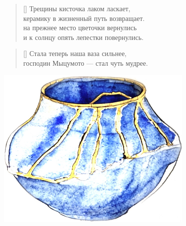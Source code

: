 \documentclass[a5paper,11pt]{memoir}
\begin{document}
\newpage

\begin{verse}[\versewidth]
Трещины кисточка лаком ласкает, \\
керамику в жизненный путь возвращает. \\
на прежнее место цветочки вернулись\\ 
и к солнцу опять лепестки повернулись.
\end{verse}

\begin{verse}[\versewidth]
Стала теперь наша ваза сильнее, \\
господин Мыцумото --- стал чуть мудрее.
\end{verse}

\vspace{1cm}

\begin{center}
\includegraphics[height=8cm]{images/vase} 
\end{center}
\newpage

%
\end{document}
